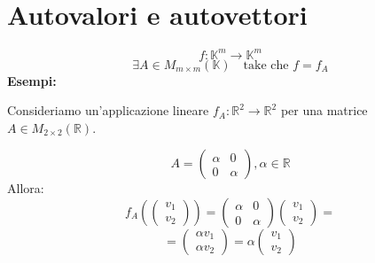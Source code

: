 \documentclass[a4paper]{article}
\theoremstyle{break}
\theoremstyle{break}
\theoremstyle{break}
\theoremstyle{break}
\begin{document}
\section{Autovalori e autovettori}
\[
  f: \mathbb{K}^m \to \mathbb{K}^m
\] 
\[
  \exists A \in M_{m \times m}(\mathbb{K}) \quad \text{take che } f = f_A
\] 
\textbf{Esempi:}

\noindent Consideriamo un'applicazione lineare \( f_A: \mathbb{R}^2 \to \mathbb{R}^2 \) per una
matrice \( A \in M_{2 \times 2}(\mathbb{R}) \).
\begin{example}
  \[
  A = \begin{pmatrix} 
    \alpha & 0\\
    0 & \alpha
  \end{pmatrix} 
  , \alpha \in \mathbb{R}
  \] 
  Allora:
  \[
    f_A \left( \begin{pmatrix} v_1\\v_2 \end{pmatrix}  \right) =
    \begin{pmatrix} 
      \alpha & 0\\
      0 & \alpha
    \end{pmatrix} 
    \begin{pmatrix} v_1\\v_2 \end{pmatrix} 
    =
  \] 
  \[
    = \begin{pmatrix} 
      \alpha v_1\\
      \alpha v_2
    \end{pmatrix} 
    =
    \alpha \begin{pmatrix} 
      v_1\\
      v_2
    \end{pmatrix}
  \] 
\end{example}
\end{document}
